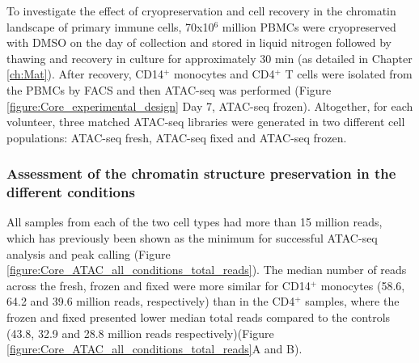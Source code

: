 To investigate the effect of cryopreservation and cell recovery in the chromatin landscape of primary immune cells, 70x10$^6$ million PBMCs were cryopreserved with DMSO on the day of collection and stored in liquid nitrogen followed by thawing and recovery in culture for approximately 30 min (as detailed in Chapter \ref{ch:Mat}). After recovery, CD14$^+$ monocytes and CD4$^+$ T cells were isolated from the PBMCs by FACS and then ATAC-seq was performed (Figure \ref{figure:Core_experimental_design} Day 7, ATAC-seq frozen). Altogether, for each volunteer, three matched ATAC-seq libraries were generated in two different cell populations: ATAC-seq fresh, ATAC-seq fixed and ATAC-seq frozen.

\subsubsection{Assessment of the chromatin structure preservation in the different conditions}

All samples from each of the two cell types had more than 15 million reads, which has previously been shown as the minimum for successful ATAC-seq analysis and peak calling (Figure \ref{figure:Core_ATAC_all_conditions_total_reads}). The median number of reads across the fresh, frozen and fixed were more similar for CD14$^+$ monocytes (58.6, 64.2 and 39.6 million reads, respectively) than in the CD4$^+$ samples, where the frozen and fixed presented lower median total reads compared to the controls (43.8, 32.9 and 28.8 million reads respectively)(Figure \ref{figure:Core_ATAC_all_conditions_total_reads}A and B).

